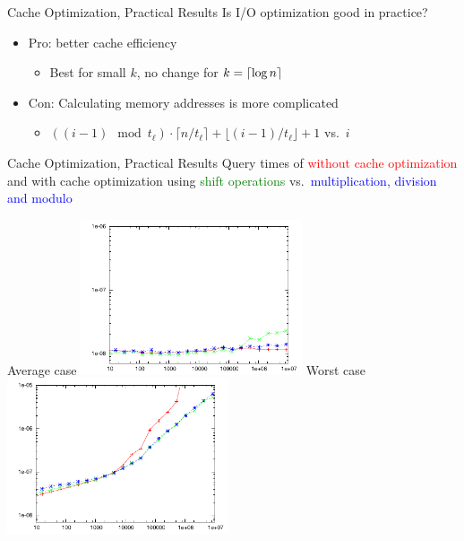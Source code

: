 \documentclass{beamer}
\begin{document}
\begin{frame}{Cache Optimization, Practical Results}
    Is I/O optimization good in practice?
    \begin{itemize}
        \item Pro: better cache efficiency
            \begin{itemize}
                \item Best for small $k$, no change for $k=\lceil\log n\rceil$
            \end{itemize}
        \item Con: Calculating memory addresses is more complicated
            \begin{itemize}
                \item $((i-1)\mod t_\ell)\cdot\lceil n/t_\ell\rceil+\lfloor (i-1)/t_\ell\rfloor+1$ vs.\ $i$
            \end{itemize}
    \end{itemize}
\end{frame}

\begin{frame}{Cache Optimization, Practical Results}
    Query times of \fprint[2]
    \textcolor{red}{without cache optimization}
    and with cache optimization using
    \textcolor{green}{shift operations} vs.\
    \textcolor{blue}{multiplication, division and modulo}
    \begin{multicols}{2}{
        \begin{center}
            Average case
            \includegraphics[width=0.49\textwidth,type=pdf,ext=.pdf,read=.pdf]{../src/results/length-slides-cache-fp2-rand10.plt}
            \newpage
            Worst case
            \includegraphics[width=0.49\textwidth,type=pdf,ext=.pdf,read=.pdf]{../src/results/length-slides-cache-fp2-alla.plt}
        \end{center}
    }
    \end{multicols}
\end{frame}
\end{document}

